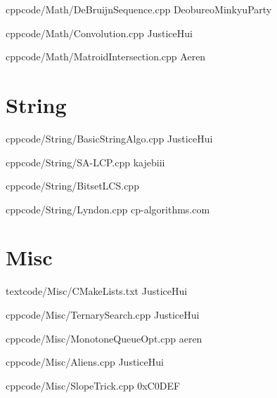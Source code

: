 \documentclass[landscape, 8pt, a4paper, oneside, twocolumn]{extarticle}
\begin{document}
{}{}
{cpp}{code/Math/DeBruijnSequence.cpp}
{DeobureoMinkyuParty}

{}{}
{cpp}{code/Math/Convolution.cpp}
{JusticeHui}

{}{}
{cpp}{code/Math/MatroidIntersection.cpp}
{Aeren}

\section{String}

{}{}
{cpp}{code/String/BasicStringAlgo.cpp}
{JusticeHui}


{}{}
{cpp}{code/String/SA-LCP.cpp}
{kajebiii}

{}{}
{cpp}{code/String/BitsetLCS.cpp}

{}{}
{cpp}{code/String/Lyndon.cpp}
{cp-algorithms.com}

\section{Misc}

{}{}
{text}{code/Misc/CMakeLists.txt}
{JusticeHui}

{}{}
{cpp}{code/Misc/TernarySearch.cpp}
{JusticeHui}

{}{}
{cpp}{code/Misc/MonotoneQueueOpt.cpp}
{aeren}

{}{}
{cpp}{code/Misc/Aliens.cpp}
{JusticeHui}

{}{}
{cpp}{code/Misc/SlopeTrick.cpp}
{0xC0DEF}

%

%

%
\end{document}
